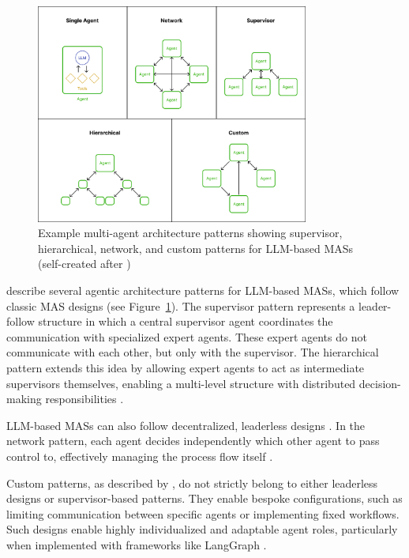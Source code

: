 \documentclass[a4paper,oneside,bibliography=totoc]{scrbook}
\begin{document}
\begin{figure}[t]
  \centering
  \includegraphics[width=0.8\textwidth]{figures/Multi-agent architectures.png}
  \caption[Example multi-agent architecture patterns showing supervisor, hierarchical, network, and custom patterns for LLM-based \acp{MAS}]{Example multi-agent architecture patterns showing supervisor, hierarchical, network, and custom patterns for LLM-based \acp{MAS} (self-created after \cite{LangChain2025b})}
  \label{fig:mas_architecture}
\end{figure}

\citet{LangChain2025b} describe several agentic architecture patterns for \ac{LLM}-based \acp{MAS}, which follow classic \ac{MAS} designs (see Figure~\ref{fig:mas_architecture}). The supervisor pattern represents a leader-follow structure in which a central supervisor agent coordinates the communication with specialized expert agents. These expert agents do not communicate with each other, but only with the supervisor. The hierarchical pattern extends this idea by allowing expert agents to act as intermediate supervisors themselves, enabling a multi-level structure with distributed decision-making responsibilities \cite{LangChain2025b}.

\ac{LLM}-based \acp{MAS} can also follow decentralized, leaderless designs \cite{OpenAI2025,LangChain2025b}. In the network pattern, each agent decides independently which other agent to pass control to, effectively managing the process flow itself \cite{LangChain2025b,OpenAI2025}.

Custom patterns, as described by \citet{LangChain2025b}, do not strictly belong to either leaderless designs or supervisor-based patterns. They enable bespoke configurations, such as limiting communication between specific agents or implementing fixed workflows. Such designs enable highly individualized and adaptable agent roles, particularly when implemented with frameworks like LangGraph \cite{LangChain2025b}.
\end{document}
